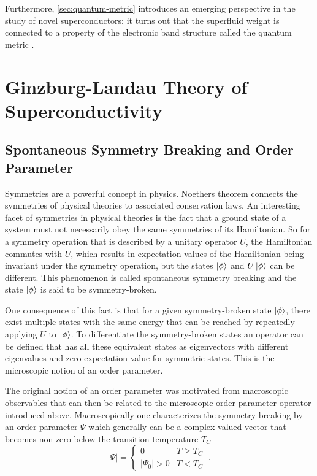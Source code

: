\documentclass[../notes.tex]{subfiles}
\begin{document}
Furthermore, \cref{sec:quantum-metric} introduces an emerging perspective in the study of novel superconductors: it turns out that the superfluid weight is connected to a property of the electronic band structure called the quantum metric \cite{peottaSuperfluidityTopologicallyNontrivial2015, yuQuantumGeometryQuantum2024}.


\section{Ginzburg-Landau Theory of Superconductivity}\label{sec:Ginzburg-Landau theory of superconductivity}

\subsection*{Spontaneous Symmetry Breaking and Order Parameter}

Symmetries are a powerful concept in physics.
Noethers theorem \cite{noetherInvarianteVariationsprobleme1918} connects the symmetries of physical theories to associated conservation laws.
An interesting facet of symmetries in physical theories is the fact that a ground state of a system must not necessarily obey the same symmetries of its Hamiltonian.
So for a symmetry operation that is described by a unitary operator \(U\), the Hamiltonian commutes with \(U\), which results in expectation values of the Hamiltonian being invariant under the symmetry operation, but the states \(\ket{\phi}\) and \(U \ket{\phi}\) can be different.
This phenomenon is called spontaneous symmetry breaking and the state \(\ket{\phi}\) is said to be symmetry-broken.

One consequence of this fact is that for a given symmetry-broken state \(\ket{\phi}\), there exist multiple states with the same energy that can be reached by repeatedly applying \(U\) to \(\ket{\phi}\).
To differentiate the symmetry-broken states an operator can be defined that has all these equivalent states as eigenvectors with different eigenvalues and zero expectation value for symmetric states.
This is the microscopic notion of an order parameter.

The original notion of an order parameter was motivated from macroscopic observables that can then be related to the microscopic order parameter operator introduced above.
Macroscopically one characterizes the symmetry breaking by an order parameter \(\Psi\) which generally can be a complex-valued vector that becomes non-zero below the transition temperature \(T_C\)
\begin{equation}
	\vert \Psi \vert =
	\begin{cases}
		0 & T \geq T_C \\
		\vert \Psi_0 \vert > 0 & T < T_C
	\end{cases} \;.
\end{equation}
\end{document}
